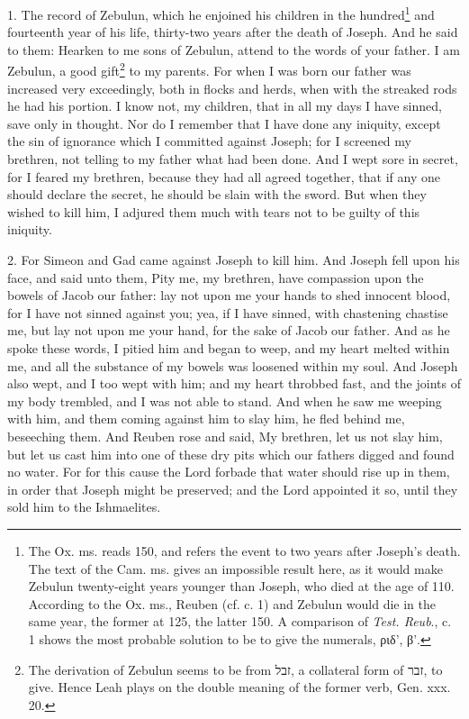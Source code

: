 1. The record of Zebulun, which he enjoined his children in the hundred\footnote{The Ox. ms. reads 150, and refers the event to two years after Joseph’s death. The text of the Cam. ms. gives an impossible result here, as it would make Zebulun twenty-eight years younger than Joseph, who died at the age of 110. According to the Ox. ms., Reuben (cf. c. 1) and Zebulun would die in the same year, the former at 125, the latter 150. A comparison of \emph{Test. Reub}., c. 1 shows the most probable solution to be to give the numerals, \textgreek{ριδ', β'}.} and fourteenth year of his life, thirty-two years after the death of Joseph. And he said to them: Hearken to me sons of Zebulun, attend to the words of your father. I am Zebulun, a good gift\footnote{The derivation of Zebulun seems to be from \texthebrew{זבל}, a collateral form of \texthebrew{זבר}, to give. Hence Leah plays on the double meaning of the former verb, Gen. xxx. 20.} to my parents. For when I was born our father was increased very exceedingly, both in flocks and herds, when with the streaked rods he had his portion. I know not, my children, that in all my days I have sinned, save only in thought. Nor do I remember that I have done any iniquity, except the sin of ignorance which I committed against Joseph; for I screened my brethren, not telling to my father what had been done. And I wept sore in secret, for I feared my brethren, because they had all agreed together, that if any one should declare the secret, he should be slain with the sword. But when they wished to kill him, I adjured them much with tears not to be guilty of this iniquity.

2. For Simeon and Gad came against Joseph to kill him. And Joseph fell upon his face, and said unto them, Pity me, my brethren, have compassion upon the bowels of Jacob our father: lay not upon me your hands to shed innocent blood, for I have not sinned against you; yea, if I have sinned, with chastening chastise me, but lay not upon me your hand, for the sake of Jacob our father. And as he spoke these words, I pitied him and began to weep, and my heart melted within me, and all the substance of my bowels was loosened within my soul. And Joseph also wept, and I too wept with him; and my heart throbbed fast, and the joints of my body trembled, and I was not able to stand. And when he saw me weeping with him, and them coming against him to slay him, he fled behind me, beseeching them. And Reuben rose and said, My brethren, let us not slay him, but let us cast him into one of these dry pits which our fathers digged and found no water. For for this cause the Lord forbade that water should rise up in them, in order that Joseph might be preserved; and the Lord appointed it so, until they sold him to the Ishmaelites.

